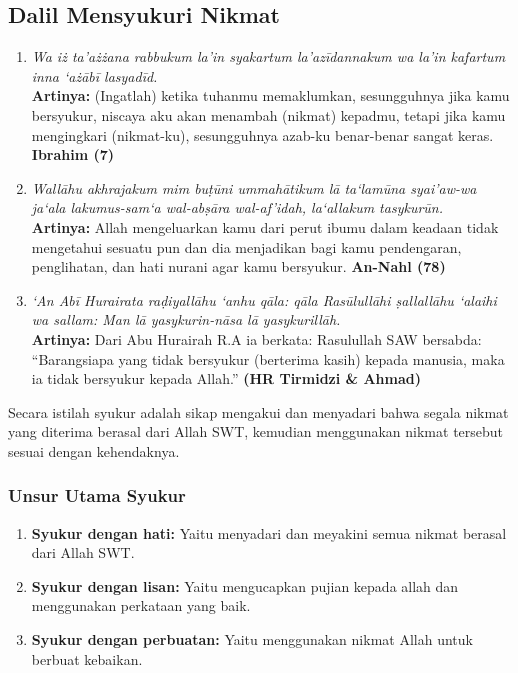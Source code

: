 \subsection{Dalil Mensyukuri Nikmat}
\begin{enumerate}
\item \textit{Wa iż ta'ażżana rabbukum la'in syakartum la'azīdannakum wa la'in kafartum inna ‘ażābī lasyadīd.} \\
  \textbf{Artinya: }(Ingatlah) ketika tuhanmu memaklumkan, sesungguhnya jika kamu bersyukur, niscaya aku akan menambah (nikmat) kepadmu, tetapi jika kamu mengingkari (nikmat-ku), sesungguhnya azab-ku benar-benar sangat keras. \textbf{Ibrahim (7)}
  
\item \textit{Wallāhu akhrajakum mim buṭūni ummahātikum lā ta‘lamūna syai'aw-wa ja‘ala lakumus-sam‘a wal-abṣāra wal-af'idah, la‘allakum tasykurūn.} \\
  \textbf{Artinya: }Allah mengeluarkan kamu dari perut ibumu dalam keadaan tidak mengetahui sesuatu pun dan dia menjadikan bagi kamu pendengaran, penglihatan, dan hati nurani agar kamu bersyukur. \textbf{An-Nahl (78)}

\item \textit{‘An Abī Hurairata raḍiyallāhu ‘anhu qāla: qāla Rasūlullāhi ṣallallāhu ‘alaihi wa sallam: Man lā yasykurin-nāsa lā yasykurillāh.} \\
  \textbf{Artinya: }Dari Abu Hurairah R.A ia berkata: Rasulullah SAW bersabda: ``Barangsiapa yang tidak bersyukur (berterima kasih) kepada manusia, maka ia tidak bersyukur kepada Allah.'' \textbf{(HR Tirmidzi \& Ahmad)}
\end{enumerate}


Secara istilah syukur adalah sikap mengakui dan menyadari bahwa segala nikmat yang diterima berasal dari Allah SWT, kemudian menggunakan nikmat tersebut sesuai dengan kehendaknya.


\subsubsection{Unsur Utama Syukur}
\begin{enumerate}
\item \textbf{Syukur dengan hati: }Yaitu menyadari dan meyakini semua nikmat berasal dari Allah SWT.
\item \textbf{Syukur dengan lisan: }Yaitu mengucapkan pujian kepada allah dan menggunakan perkataan yang baik.
\item \textbf{Syukur dengan perbuatan: }Yaitu menggunakan nikmat Allah untuk berbuat kebaikan.
\end{enumerate}


